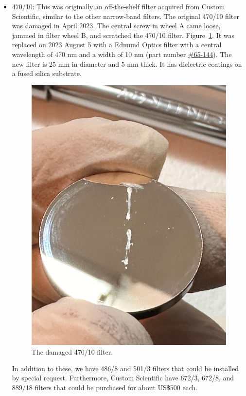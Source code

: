 \begin{itemize}
\item 470/10: This was originally an off-the-shelf filter acquired from Custom Scientific, similar to the other narrow-band filters. The original 470/10 filter was damaged in April 2023. The central screw in wheel A came loose, jammed in filter wheel B, and scratched the 470/10 filter. Figure~\ref{figure:huitzi-f20-damaged-470-10-filter}. It was replaced on 2023 August 5 with a Edmund Optics filter with a central wavelength of 470 nm and a width of 10 nm (part number \href{https://www.edmundoptics.com/p/470nm-cwl-25mm-dia-hard-coated-od-4-10nm-bandpass-filter/19794/}{\#65-144}). The new filter is 25 mm in diameter and 5 mm thick. It has dielectric coatings on a fused silica substrate.

\begin{figure}
\begin{center}
\includegraphics[width=0.7\linewidth]{figures/huitzi-f20-damaged-470-10-filter.jpg}
\medskip
\caption{The damaged 470/10 filter.}
\label{figure:huitzi-f20-damaged-470-10-filter}
\end{center}
\end{figure}



In addition to these, we have 486/8 and 501/3 filters that could be installed by special request. Furthermore, Custom Scientific have 672/3, 672/8, and 889/18 filters that could be purchased for about US\$500 each.
\end{itemize}


